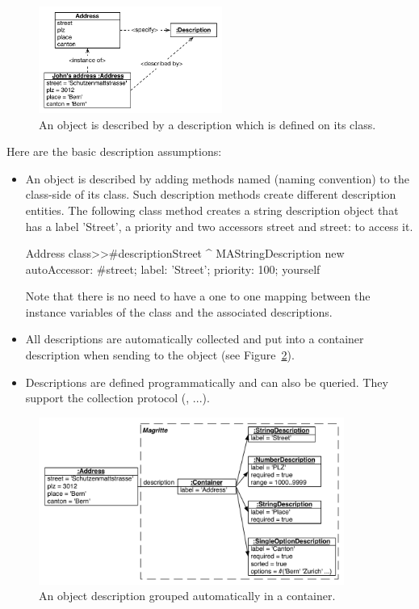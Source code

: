 \documentclass[a4paper,10pt,twoside]{book}
\begin{document}
\begin{figure}[ht!]
\begin{center}
\includegraphics[width=6cm]{basicPrinciple}
\caption{An object is described by a description which is defined on its class.\label{fig:mabasicPrinciple}}
\end{center}
\end{figure}


Here are the basic description assumptions:

\begin{itemize}
\item An object is described by adding methods named  (naming convention) to the class-side of its class. Such description methods create different description entities. The following  class method creates a string description object that has a label 'Street', a priority and two accessors street and street: to access it. 

\begin{code}{}
Address class>>#descriptionStreet
	^ MAStringDescription new
		autoAccessor: #street;
		label: 'Street';
		priority: 100;
		yourself
\end{code}

Note that there is no need to have a one to one mapping between the instance variables of the class and the associated descriptions. 

\item All descriptions are automatically collected and put into a container description when sending  to the object (see Figure~\ref{fig:container}).

\item Descriptions are defined programmatically and can also be queried. They support the collection protocol (, ...).
\end{itemize}

\begin{figure}[ht!]
\begin{center}
\includegraphics[width=10cm]{describingAddress}
\caption{An object description grouped automatically in a container.\label{fig:container}}
\end{center}
\end{figure}
\end{document}
